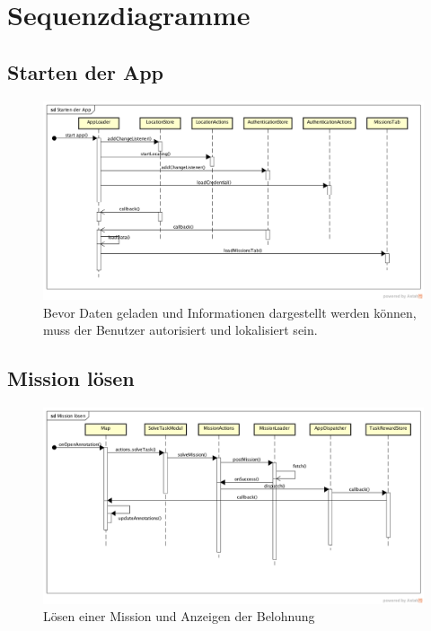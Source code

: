\label{pd-sequenzdiagramme}
\section{Sequenzdiagramme}
\subsection{Starten der App}
\begin{figure}[H]
 	\centering
 	\includegraphics[width=\textwidth]{images/projektdokumentation/sd-app-start.png}
 	\caption{Bevor Daten geladen und Informationen dargestellt werden können, muss der Benutzer autorisiert und lokalisiert sein.}
 	\label{image-sd-start-app}
\end{figure}

\subsection{Mission lösen}
\begin{figure}[H]
 	\centering
 	\includegraphics[width=\textwidth]{images/projektdokumentation/sd-mission-loesen.png}
 	\caption{Lösen einer Mission und Anzeigen der Belohnung}
 	\label{image-sd-solve-mission}
\end{figure}